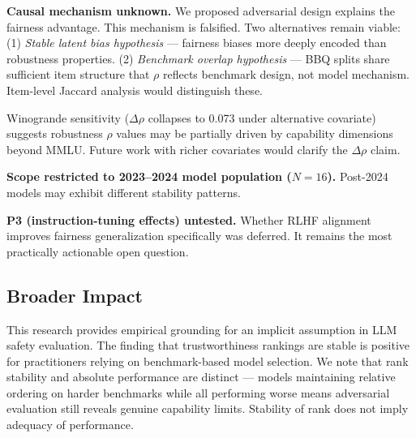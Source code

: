 \textbf{Causal mechanism unknown.} We proposed adversarial design explains the fairness advantage. This mechanism is falsified. Two alternatives remain viable: (1) \emph{Stable latent bias hypothesis} --- fairness biases more deeply encoded than robustness properties. (2) \emph{Benchmark overlap hypothesis} --- BBQ splits share sufficient item structure that $\rho$ reflects benchmark design, not model mechanism. Item-level Jaccard analysis would distinguish these.

Winogrande sensitivity ($\Delta\rho$ collapses to 0.073 under alternative covariate) suggests robustness $\rho$ values may be partially driven by capability dimensions beyond MMLU. Future work with richer covariates would clarify the $\Delta\rho$ claim.

\textbf{Scope restricted to 2023--2024 model population ($N=16$).} Post-2024 models may exhibit different stability patterns.

\textbf{P3 (instruction-tuning effects) untested.} Whether RLHF alignment improves fairness generalization specifically was deferred. It remains the most practically actionable open question.

\subsection{Broader Impact}

This research provides empirical grounding for an implicit assumption in LLM safety evaluation. The finding that trustworthiness rankings are stable is positive for practitioners relying on benchmark-based model selection. We note that rank stability and absolute performance are distinct --- models maintaining relative ordering on harder benchmarks while all performing worse means adversarial evaluation still reveals genuine capability limits. Stability of rank does not imply adequacy of performance.
